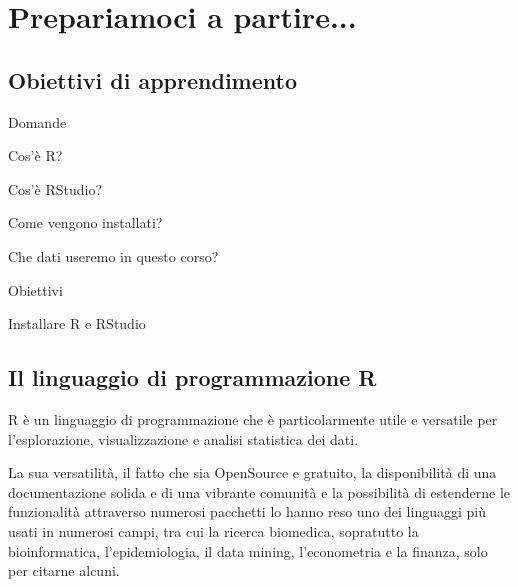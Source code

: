 \chapter{Prepariamoci a partire...}
\label{cap:installareR}


\section*{Obiettivi di apprendimento}


\begin{multicols}{2}
\begin{tcolorbox}[width=1\linewidth, halign=left, colframe=blue!60, colback=white, boxsep=1mm, arc=3mm]

Domande

\begin{myitemize}
	\item Cos'\`e R?
	\item Cos'\`e RStudio?
	\item Come vengono installati?
	\item Che dati useremo in questo corso?
\end{myitemize}

\end{tcolorbox} 
\columnbreak
\begin{tcolorbox}[width=1\linewidth, halign=left, colframe=blue!60, colback=white, boxsep=1mm, arc=3mm]

Obiettivi

\begin{myitemize}
	\item Installare R e RStudio
\end{myitemize}

\end{tcolorbox} 
\columnbreak
\end{multicols}





\section{Il linguaggio di programmazione R}
\label{sec:Rintro}

R è un linguaggio di programmazione che è particolarmente utile e versatile per l'esplorazione, visualizzazione e analisi statistica dei dati. 

\noindent La sua versatilit\`a, il fatto che sia OpenSource e gratuito, la disponibilit\`a di una documentazione solida e di una vibrante comunit\`a e la possibilit\`a di estenderne le funzionalit\`a attraverso numerosi pacchetti lo hanno reso uno dei linguaggi pi\`u usati in numerosi campi, tra cui la ricerca biomedica, sopratutto la bioinformatica, l'epidemiologia, il data mining, l'econometria e la finanza, solo per citarne alcuni. 

